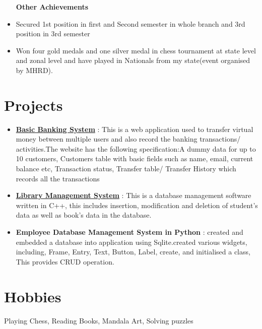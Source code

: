 \documentclass[margin, centered]{res}
\begin{document}
\begin{resume}
\begin{itemize}[leftmargin=*]
 
 \textbf{Other Achievements}
 \item Secured 1st position in first and Second semester in whole branch and 3rd position in 3rd semester
 \item Won four gold medals and one silver medal in chess tournament at state level and zonal level and have played in Nationals from my state(event organised by MHRD).
\end{itemize}
\section{Projects}
\begin{itemize}[leftmargin=*]
 \item \textbf{\href{https://github.com/tannuchoudhary/basic_banking_system}{Basic Banking System}} : This is a web application used to transfer virtual money between multiple users and also record the banking transactions/ activities.The website has the following specification:A dummy data for up to 10 customers, Customers table with basic fields such as name, email, current balance etc, Transaction status, Transfer table/ Transfer History which records all the transactions
 \item \textbf{\href{https://github.com/tannuchoudhary/Library-Management-System}{Library Management System}} : This is a database management software written in C++, this includes insertion, modification and deletion of student's data as well as book's data in the database.
 \item \textbf{Employee Database Management System in Python} : created and embedded a database into application using Sqlite.created various widgets, including, Frame, Entry, Text, Button, Label, create, and initialised a class, This provides CRUD operation.
 
\end{itemize}



\section{Hobbies}
Playing Chess, Reading Books, Mandala Art, Solving puzzles


\end{resume}
\end{document}
